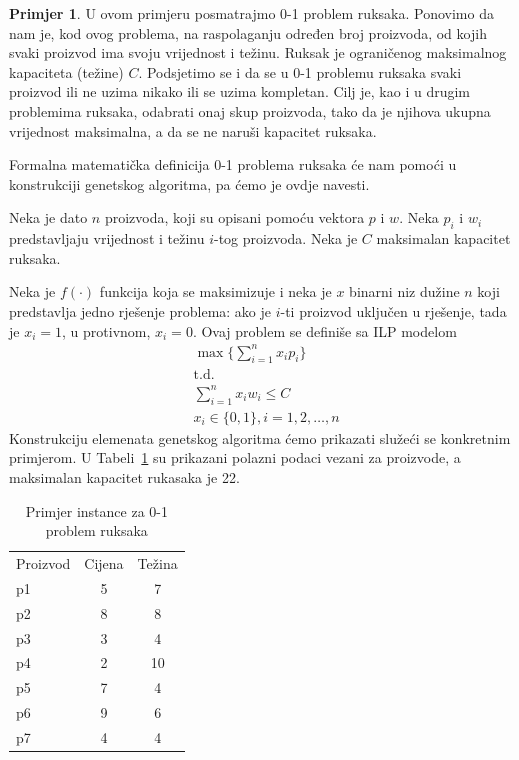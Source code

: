\documentclass[a4paper, utf8, 11pt, colorlinks]{book}
\theoremstyle{definition}
\newtheorem{primjer}{Primjer}[chapter]
\begin{document}
\begin{primjer}\label{primjer:01ruksak} U ovom primjeru posmatrajmo 0-1 problem ruksaka. Ponovimo da nam je, kod ovog problema, na raspolaganju određen broj proizvoda, od kojih svaki proizvod ima svoju vrijednost i težinu. Ruksak je ograničenog maksimalnog kapaciteta (težine) $C$. Podsjetimo se i da se u 0-1 problemu ruksaka svaki proizvod ili ne uzima nikako ili se uzima kompletan. Cilj je, kao i u drugim problemima ruksaka, odabrati onaj skup proizvoda, tako da je njihova ukupna vrijednost maksimalna, a da se ne naruši kapacitet ruksaka.
\end{primjer}
Formalna matematička definicija 0-1 problema ruksaka će nam pomoći u konstrukciji genetskog algoritma, pa ćemo je ovdje navesti.

Neka je dato $n$ proizvoda, koji su opisani pomoću vektora $p$ i $w$. Neka $p_i$ i $w_i$ predstavljaju vrijednost i težinu $i$-tog proizvoda. Neka je $C$ maksimalan kapacitet ruksaka.

Neka je $f(\cdot)$ funkcija koja se maksimizuje i neka je $x$ binarni niz dužine $n$ koji predstavlja jedno rješenje problema: ako je $i$-ti proizvod uključen u rješenje, tada je $x_i = 1$, u protivnom, $x_i =0$. Ovaj problem se definiše sa ILP modelom
\begin{align*}
& \max \{\sum_{i=1}^{n}x_ip_i\}\\
&\mbox{t.d.}\\
&\sum_{i=1}^{n}x_iw_i\leqslant C\\
&x_i\in\{0,1\}, i = 1,2,\ldots,n
\end{align*}
Konstrukciju elemenata genetskog algoritma ćemo prikazati služeći se konkretnim primjerom. U Tabeli~\ref{tbl:01ruksak} su prikazani polazni podaci vezani za proizvode, a maksimalan kapacitet rukasaka je 22.

\begin{table}\begin{center}
	\begin{tabular}{lcc}\hline
		Proizvod&Cijena&Težina\\
		p1&5&7\\
		p2&8&8\\
		p3&3&4\\
		p4&2&10\\
		p5&7&4\\
		p6&9&6\\
		p7&4&4\\\hline
		\end{tabular}
	\end{center}\caption{Primjer instance za 0-1 problem ruksaka}\label{tbl:01ruksak}
\end{table} 
\end{document}
